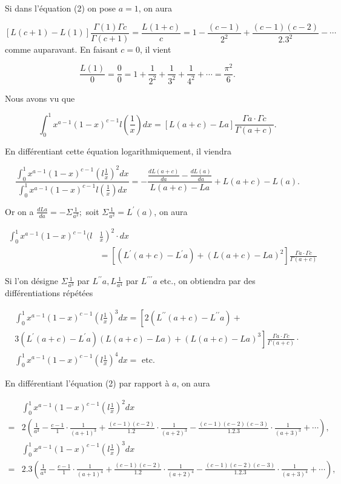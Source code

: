 \documentclass{article}
\begin{document}
Si dans l'équation (2) on pose \(a=1\), on aura

\[
[L(c+1)-L(1)] \frac{\Gamma(1) \Gamma c}{\Gamma(c+1)}=\frac{L(1+c)}{c}=1-\frac{(c-1)}{2^{2}}+\frac{(c-1)(c-2)}{2.3^{2}}-\cdots
\]
comme auparavant. En faisant \(c=0\), il vient

\[
\frac{L(1)}{0}=\frac{0}{0}=1+\frac{1}{2^{2}}+\frac{1}{3^{2}}+\frac{1}{4^{2}}+\cdots=\frac{\pi^{2}}{6} .
\]

Nous avons vu que

\[
\int_{0}^{1} x^{a-1}(1-x)^{c-1} l\left(\frac{1}{x}\right) d x=[L(a+c)-L a] \frac{\Gamma a \cdot \Gamma c}{\Gamma(a+c)} .
\]

En différentiant cette équation logarithmiquement, il viendra

\[
\frac{\int_{0}^{1} x^{a-1}(1-x)^{c-1}\left(l \frac{1}{x}\right)^{2} d x}{\int_{0}^{1} x^{a-1}(1-x)^{c-1} l\left(\frac{1}{x}\right) d x}=-\frac{\frac{d L(a+c)}{d a}-\frac{d L(a)}{d a}}{L(a+c)-L a}+L(a+c)-L(a) .
\]

Or on a \(\frac{d L a}{d a}=-\Sigma \frac{1}{a^{2}} ;\) soit \(\Sigma \frac{1}{a^{2}}=L^{\prime}(a)\), on aura

\[
\begin{aligned}
\int_{0}^{1} x^{a-1}(1-x)^{c-1}(l & \left.\frac{1}{x}\right)^{2} \cdot d x \\
& =\left[\left(L^{\prime}(a+c)-L^{\prime} a\right)+(L(a+c)-L a)^{2}\right] \frac{\Gamma a \cdot \Gamma c}{\Gamma(a+c)}
\end{aligned}
\]

Si l'on désigne \(\Sigma \frac{1}{a^{3}}\) par \(L^{\prime \prime} a, L \frac{1}{a^{4}}\) par \(L^{\prime \prime \prime} a\) etc., on obtiendra par des différentiations répétées

\[
\begin{gathered}
\int_{0}^{1} x^{a-1}(1-x)^{c-1}\left(l \frac{1}{x}\right)^{3} d x=\left[2\left(L^{\prime \prime}(a+c)-L^{\prime \prime} a\right)+\right. \\
\left.3\left(L^{\prime}(a+c)-L^{\prime} a\right)(L(a+c)-L a)+(L(a+c)-L a)^{3}\right] \frac{\Gamma a \cdot \Gamma c}{\Gamma(a+c)} \cdot \\
\int_{0}^{1} x^{a-1}(1-x)^{c-1}\left(l \frac{1}{x}\right)^{4} d x=\text { etc. }
\end{gathered}
\]

En différentiant l'équation (2) par rapport à \(a\), on aura

\[
\begin{aligned}
& \int_{0}^{1} x^{a-1}(1-x)^{c-1}\left(l \frac{1}{x}\right)^{2} d x \\
= & 2\left(\frac{1}{a^{3}}-\frac{c-1}{1} \cdot \frac{1}{(a+1)^{3}}+\frac{(c-1)(c-2)}{1.2} \cdot \frac{1}{(a+2)^{3}}-\frac{(c-1)(c-2)(c-3)}{1.2 .3} \cdot \frac{1}{(a+3)^{3}}+\cdots\right), \\
& \int_{0}^{1} x^{a-1}(1-x)^{c-1}\left(l \frac{1}{x}\right)^{3} d x \\
= & 2.3\left(\frac{1}{a^{4}}-\frac{c-1}{1} \cdot \frac{1}{(a+1)^{4}}+\frac{(c-1)(c-2)}{1.2} \cdot \frac{1}{(a+2)^{4}}-\frac{(c-1)(c-2)(c-3)}{1.2 .3} \cdot \frac{1}{(a+3)^{4}}+\cdots\right),
\end{aligned}
\]
\end{document}
